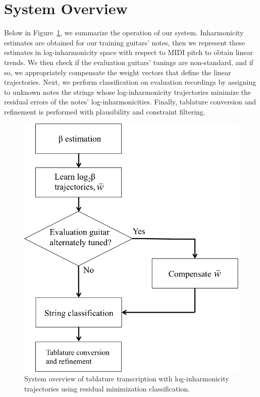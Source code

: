 \documentclass[12pt]{cmuthesis}
\begin{document}
\section{System Overview}
Below in Figure~\ref{fig:overview}, we summarize the operation of our system. Inharmonicity estimates are obtained for our training guitars' notes, then we represent these estimates in log-inharmonicity space with respect to MIDI pitch to obtain linear trends. We then check if the evaluation guitars' tunings are non-standard, and if so, we appropriately compensate the weight vectors that define the linear trajectories. Next, we perform classification on evaluation recordings by assigning to unknown notes the strings whose log-inharmonicity trajectories minimize the residual errors of the notes' log-inharmonicities. Finally, tablature conversion and refinement is performed with plausibility and constraint filtering.
\begin{figure}[!htbp] 
\centering
\includegraphics[scale=0.6]{overview}
\caption{System overview of tablature transcription with log-inharmonicity trajectories using residual minimization classification.}
\label{fig:overview}
\end{figure}
\end{document}
